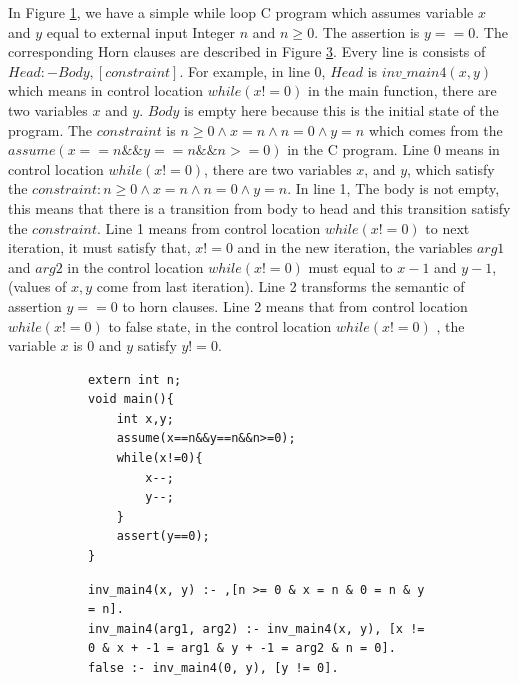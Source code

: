 \documentclass{article}
\begin{document}
In Figure \ref{while-C-program}, we have a simple while loop C program which assumes variable $x$ and $y$ equal to external input Integer $n$ and $n\geq 0$. The assertion is $y==0$. The corresponding Horn clauses are described in  Figure \ref{while-C-horn-clauses}. Every line is consists of $Head:-Body,[constraint]$. For example, in line 0, $Head$ is $inv\_main4(x, y)$ which means in control location $while(x!=0)$ in the main function, there are two variables $x$ and $y$. $Body$ is empty here because this is the initial state of the program. The $constraint$ is $n \geq 0 \wedge x = n \wedge n = 0 \wedge y = n$ which comes from the $assume(x==n\&\&y==n\&\&n>=0)$ in the C program. Line 0 means in control location $while(x!=0)$, there are two variables $x$, and $y$, which satisfy the $constraint: n \geq 0 \wedge x = n \wedge n = 0 \wedge y = n$. In line 1, The body is not empty, this means that there is a transition from body to head and this transition satisfy the $constraint$. Line 1 means from control location $while(x!=0)$ to next iteration, it must satisfy that, $x!=0$ and in the new iteration, the variables $arg1$ and $arg2$ in the control location $while(x!=0)$ must equal to $x-1$ and $y-1$, (values of $x,y$ come from last iteration). Line 2 transforms the semantic of assertion $y==0$ to horn clauses. Line 2 means that from control  location $while(x!=0)$ to false state, in the control location $while(x!=0)$ , the variable $x$ is 0 and $y$ satisfy $y!=0$.


\begin{figure}[h]
\begin{subfigure}[b]{0.4\textwidth}
\begin{lstlisting}
extern int n;
void main(){
    int x,y;
    assume(x==n&&y==n&&n>=0);
    while(x!=0){
        x--;
        y--;
    }
    assert(y==0);
}
\end{lstlisting}\label{while-C-program}
\end{subfigure}
\begin{subfigure}[b]{0.6\textwidth}
\begin{lstlisting}
inv_main4(x, y) :- ,[n >= 0 & x = n & 0 = n & y = n].
inv_main4(arg1, arg2) :- inv_main4(x, y), [x != 0 & x + -1 = arg1 & y + -1 = arg2 & n = 0].
false :- inv_main4(0, y), [y != 0].
\end{lstlisting}\label{while-C-horn-clauses}
  \end{subfigure}
  \caption{}
\end{figure}
\end{document}
